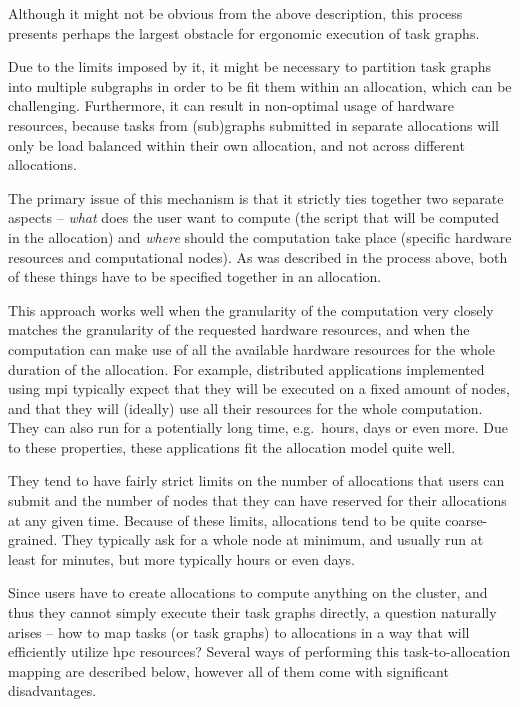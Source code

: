 Although it might not be obvious from the above description, this process presents perhaps the
largest obstacle for ergonomic execution of task graphs.


Due to the limits imposed by it, it might be necessary to partition task graphs into multiple
subgraphs in order to be fit them within an allocation, which can be challenging. Furthermore, it
can result in non-optimal usage of hardware resources, because tasks from (sub)graphs submitted in
separate allocations will only be load balanced within their own allocation, and not across
different allocations.

The primary issue of this mechanism is that it strictly ties together two separate aspects --
\emph{what} does the user want to compute (the script that will be computed in the
allocation) and \emph{where} should the computation take place (specific hardware
resources and computational nodes). As was described in the process above, both of these things
have to be specified together in an allocation.


This approach works well when the granularity of the computation very closely matches the
granularity of the requested hardware resources, and when the computation can make use of all the
available hardware resources for the whole duration of the allocation. For example, distributed
applications implemented using \gls{mpi} typically expect that they will be
executed on a fixed amount of nodes, and that they will (ideally) use all their resources for the
whole computation. They can also run for a potentially long time, e.g.\ hours, days or even more.
Due to these properties, these applications fit the allocation model quite well.

They tend to have fairly strict limits on the number of allocations that users can submit and the
number of nodes that they can have reserved for their allocations at any given time. Because of
these limits, allocations tend to be quite coarse-grained. They typically ask for a whole node at
minimum, and usually run at least for minutes, but more typically hours or even days.

Since users have to create allocations to compute anything on the cluster, and thus they cannot
simply execute their task graphs directly, a question naturally arises -- how to map tasks (or task
graphs) to allocations in a way that will efficiently utilize \gls{hpc}
resources? Several ways of performing this task-to-allocation mapping are described below, however
all of them come with significant disadvantages.

